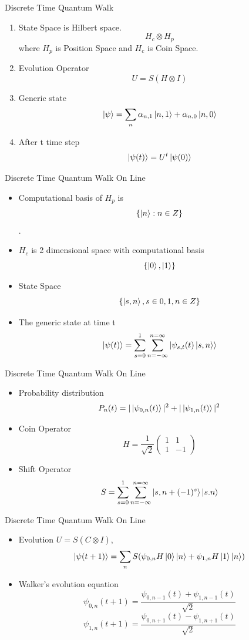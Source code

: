 \documentclass[xcolor=svgnames]{beamer}
\newcommand{\tens}[1]{
  \mathbin{\mathop{\otimes}\limits_{#1}}}
\begin{document}
\begin{frame}{Discrete Time Quantum Walk}
\begin{enumerate}
    \item State Space is Hilbert space. $$H_c \tens{} H_p$$ where $H_p$ is Position Space and $H_c$ is Coin Space.
    \item Evolution Operator $$U = S ( H \tens{} I)$$
    \item Generic state $$\ket{\psi} = \sum_{n} \alpha_{n,1}\ket{n,1} + \alpha_{n,0}\ket{n,0}$$
    \item After t time step $$\ket{\psi(t)} = U^t\ket{\psi(0)}$$
\end{enumerate}
\end{frame}

\begin{frame}{Discrete Time Quantum Walk On Line}
    \begin{itemize}
        \item Computational basis of $H_p$ is $$\{\ket{n}: n \in Z\}$$.
        \item $H_c$ is 2 dimensional space with computational basis $$\{\ket{0},\ket{1}\}$$
        \item State Space $$\{\ket{s,n}, s \in {0,1}, n \in Z\}$$
        \item The generic state at time t $$\ket{\psi(t)} = \sum_{s=0}^{1}\sum_{n=-\infty}^{n=\infty}\ket{\psi_{s,t}(t)\ket{s,n}}$$
    \end{itemize}
\end{frame}
\begin{frame}{Discrete Time Quantum Walk On Line}
\begin{itemize}
    \item Probability distribution $$P_n(t) = |\ket{\psi_{0,n}(t)}|^2 + |\ket{\psi_{1,n}(t)}|^2 $$
    \item Coin Operator $$H  = \dfrac{1}{\sqrt{2}}\begin{pmatrix}
           1 & 1\\
           1 & -1
\end{pmatrix}$$
    \item Shift Operator $$ S = \sum_{s=0}^{1}\sum_{n=-\infty}^{n=\infty} \ket{s,n+(-1)^s}\ket{s.n}$$
\end{itemize}
\end{frame}

\begin{frame}{Discrete Time Quantum Walk On Line}
    \begin{itemize}
        \item Evolution $U = S(C\tens{}I)$, $$\ket{\psi(t+1)} = \sum_{n}S(\psi_{0,n}H\ket{0}\ket{n}+\psi_{1,n}H\ket{1}\ket{n})$$
    \item Walker's evolution equation
$$\psi_{0,n}(t+1) = \dfrac{\psi_{0,n-1}(t) + \psi_{1,n-1}(t)}{\sqrt{2}}$$
    $$\psi_{1,n}(t+1) = \dfrac{\psi_{0,n+1}(t) - \psi_{1,n+1}(t)}{\sqrt{2}}$$
    \end{itemize}
\end{frame}
\end{document}
